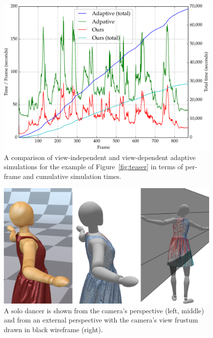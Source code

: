 \documentclass[10pt,journal,compsoc,twoside]{TexInputs/IEEEtran}
\begin{document}
\begin{figure}[t]
    \centering
    \includegraphics[width=1.0\columnwidth]{timings}
    \caption{A comparison of view-independent and view-dependent adaptive simulations for
        the example of Figure~\ref{fig:teaser} in terms of per-frame and cumulative simulation times.}
    \label{fig:comparison}
\end{figure}

\begin{figure}[t]
    \centering
    \includegraphics[width=1.0\columnwidth]{solo/solo}
    \caption{A solo dancer is shown from the camera's perspective (left, middle) and from
    an external perspective with the camera's view frustum drawn in black wireframe (right).}
    \label{fig:solo_dancer}
\end{figure}
\end{document}
